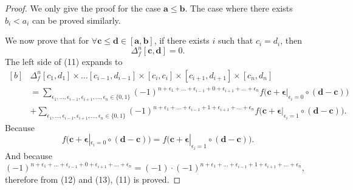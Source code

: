 \documentclass[10pt,a4paper]{amsart}
\begin{document}
\begin{proof}
    We only give the proof for the case \(\boldsymbol{a}\leq\boldsymbol{b}\). The case where there exists \(b_i<a_i\) can be proved similarly. 

    
    We now prove that for \(\forall\boldsymbol{c}\leq\boldsymbol{d}\in[\boldsymbol{a},\boldsymbol{b}]\), if there exists \(i\) such that \(c_i=d_i\), then
    \begin{equation}
        \Delta_{f}^n[\boldsymbol{c},\boldsymbol{d}]=0.
    \end{equation}
    The left side of (11) expands to
    \begin{equation}
        \begin{aligned}[b]
        &\Delta_{f}^n[c_1,d_1]\times\dots[c_{i-1},d_{i-1}]\times[c_i,c_i]\times[c_{i+1},d_{i+1}]\times[c_n,d_n]\\
        &=\sum_{\epsilon_1,\dots,\epsilon_{i-1},\epsilon_{i+1},\dots,\epsilon_n\in\{0,1\}}(-1)^{n+\epsilon_1+\dots+\epsilon_{i-1}+0+\epsilon_{i+1}+\dots+\epsilon_n}f\big(\boldsymbol{c}+\boldsymbol{\epsilon}|_{\epsilon_i=0}\circ(\boldsymbol{d}-\boldsymbol{c})\big)\\
        &+\sum_{\epsilon_1,\dots,\epsilon_{i-1},\epsilon_{i+1},\dots,\epsilon_n\in\{0,1\}}(-1)^{n+\epsilon_1+\dots+\epsilon_{i-1}+1+\epsilon_{i+1}+\dots+\epsilon_n}f\big(\boldsymbol{c}+\boldsymbol{\epsilon}|_{\epsilon_i=1}\circ(\boldsymbol{d}-\boldsymbol{c})\big).
        \end{aligned}
    \end{equation}
    Because
    \begin{equation}
        f\big(\boldsymbol{c}+\boldsymbol{\epsilon}|_{\epsilon_i=0}\circ(\boldsymbol{d}-\boldsymbol{c})\big)=f\big(\boldsymbol{c}+\boldsymbol{\epsilon}|_{\epsilon_i=1}\circ(\boldsymbol{d}-\boldsymbol{c})\big).
    \end{equation}
    And because\((-1)^{n+\epsilon_1+\dots+\epsilon_{i-1}+0+\epsilon_{i+1}+\dots+\epsilon_n}=(-1)\cdot(-1)^{n+\epsilon_1+\dots+\epsilon_{i-1}+1+\epsilon_{i+1}+\dots+\epsilon_n}\), 
    therefore from (12) and (13), (11) is proved.
    

\end{proof}
\end{document}

